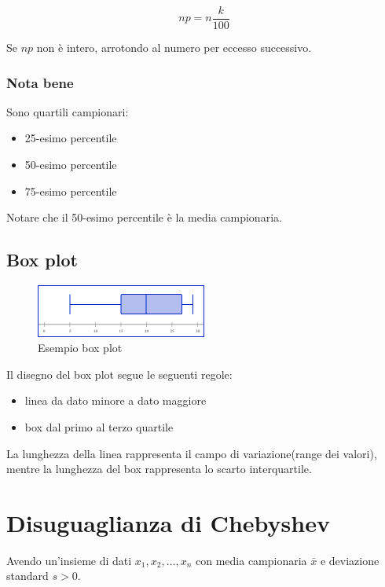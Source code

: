 \begin{equation}
   np = n \displaystyle\frac{k}{100} 
\end{equation}

Se $np$ non è intero, arrotondo al numero per eccesso successivo.



\subsubsection{Nota bene}
Sono quartili campionari: 
\begin{itemize}
    \item 25-esimo percentile
    \item 50-esimo percentile
    \item 75-esimo percentile
\end{itemize}

Notare che il 50-esimo percentile è la media campionaria.


\subsection{Box plot}
\begin{figure}[!ht]
    \begin{center}
        \includegraphics[width=0.5\textwidth]{./images/box_plot_example.png}
    \end{center}
    \caption{Esempio box plot}
    \label{fig:box_plot_example}
\end{figure}

Il disegno del box plot segue le seguenti regole:
\begin{itemize}
    \item linea da dato minore a dato maggiore
    \item box dal primo al terzo quartile
\end{itemize}

La lunghezza della linea rappresenta il campo di variazione(range dei valori), mentre la lunghezza del box 
rappresenta lo scarto interquartile. 

\section{Disuguaglianza di Chebyshev}
Avendo un'insieme di dati $x_1, x_2, \dots, x_n$ con media campionaria $\bar{x}$ e deviazione standard $s > 0$. 

